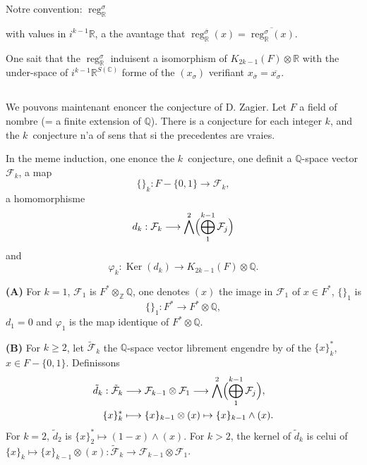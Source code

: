 \documentclass[12pt,a4paper]{article}
\theoremstyle{plain}
\theoremstyle{definition}
\theoremstyle{remark}
\DeclareMathOperator*{\Ker}{Ker}
\DeclareMathOperator{\reg}{reg}
\newcommand{\Q}{\mathbb{Q}}
\newcommand{\R}{\mathbb{R}}
\newcommand{\C}{\mathbb{C}}
\newcommand{\Z}{\mathbb{Z}}
\newcommand{\F}{\mathcal{F}}
\begin{document}
Notre convention: $\reg_\R^\sigma$ {with values in $i^{k-1}\R$, a the avantage that $\reg_\R^{\bar{\sigma}}(x)=\overline{\reg_\R^\sigma(x)}$.

One sait that the $\reg_\R^\sigma$ induisent a isomorphism of $K_{2k-1}(F)\otimes\R$ with the under-space of $i^{k-1}\R^{S(\C)}$ form{e} of the $(x_\sigma)$ v{e}rifiant $x_{\bar{\sigma}}=\overline{x_\sigma}$.

\subsection{}

We pouvons maintenant {e}noncer the conjecture of D. Zagier. Let $F$ a field of nombre (= a finite extension of $\Q$). There is a conjecture for each integer $k$, and the $k$\ieme\ conjecture n'a of sens that si the pr{e}cedentes are vraies.

In the m{e}me induction, one {e}nonce the $k$\ieme\ conjecture, one d{e}finit a $\Q$-space vector $\F_k$, a map
\begin{equation*}
\{\}_k : F-\{0,1\} \longrightarrow \F_k,
\end{equation*}
a homomorphisme
\begin{equation*}
d_k : \F_k \longrightarrow \bigwedge^2\Bigl(\bigoplus_1^{k-1}\F_j\Bigr)
\end{equation*}
and
\begin{equation*}
\varphi_k : \Ker(d_k) \longrightarrow K_{2k-1}(F)\otimes\Q.
\end{equation*}

\textbf{(A)} For $k=1$, $\F_1$ is $F^*\otimes_\Z\Q$, one denotes $(x)$ the image in $\F_1$ of $x\in F^*$, $\{\}_1$ is
\begin{equation*}
\{\}_1 : F^* \longrightarrow F^*\otimes\Q,
\end{equation*}
$d_1=0$ and $\varphi_1$ is the map identique of $F^*\otimes\Q$.

\textbf{(B)} For $k\geq 2$, let $\tilde{\F}_k$ the $\Q$-space vector librement engendr{e} by of the $\{x\}_k^*$, $x\in F-\{0,1\}$. D{e}finissons
\begin{align*}
\tilde{d}_k : \tilde{\F}_k &\longrightarrow \F_{k-1}\otimes\F_1 \longrightarrow \bigwedge^2\Bigl(\bigoplus_1^{k-1}\F_j\Bigr),\\
\{x\}_k^* &\longmapsto \{x\}_{k-1}\otimes(x) \mapsto \{x\}_{k-1}\wedge(x).
\end{align*}
For $k=2$, $\tilde{d}_2$ is $\{x\}_2^*\mapsto(1-x)\wedge(x)$. For $k>2$, the kernel of $\tilde{d}_k$ is celui of $\{x\}_k\mapsto\{x\}_{k-1}\otimes(x):\tilde{\F}_k\to\F_{k-1}\otimes\F_1$.

}
\end{document}
